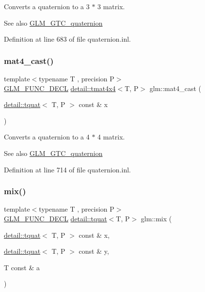 Converts a quaternion to a 3 $\ast$ 3 matrix.

\begin{DoxySeeAlso}{See also}
\hyperlink{group__gtc__quaternion}{G\+L\+M\+\_\+\+G\+T\+C\+\_\+quaternion} 
\end{DoxySeeAlso}


Definition at line 683 of file quaternion.\+inl.

\mbox{\label{group__gtc__quaternion_gafc4e34c836f7ccb5f3bb2a0373c831e0}} 
\subsubsection{\texorpdfstring{mat4\+\_\+cast()}{mat4\_cast()}}
{\footnotesize\ttfamily template$<$typename T , precision P$>$ \\
\hyperlink{setup_8hpp_ab2d052de21a70539923e9bcbf6e83a51}{G\+L\+M\+\_\+\+F\+U\+N\+C\+\_\+\+D\+E\+CL} \hyperlink{structglm_1_1detail_1_1tmat4x4}{detail\+::tmat4x4}$<$T, P$>$ glm\+::mat4\+\_\+cast (\begin{DoxyParamCaption}\item[{\hyperlink{structglm_1_1detail_1_1tquat}{detail\+::tquat}$<$ T, P $>$ const \&}]{x }\end{DoxyParamCaption})}

Converts a quaternion to a 4 $\ast$ 4 matrix.

\begin{DoxySeeAlso}{See also}
\hyperlink{group__gtc__quaternion}{G\+L\+M\+\_\+\+G\+T\+C\+\_\+quaternion} 
\end{DoxySeeAlso}


Definition at line 714 of file quaternion.\+inl.

\mbox{\label{group__gtc__quaternion_gafabf175ae3e2cd30bf58dc313321955a}} 
\subsubsection{\texorpdfstring{mix()}{mix()}}
{\footnotesize\ttfamily template$<$typename T , precision P$>$ \\
\hyperlink{setup_8hpp_ab2d052de21a70539923e9bcbf6e83a51}{G\+L\+M\+\_\+\+F\+U\+N\+C\+\_\+\+D\+E\+CL} \hyperlink{structglm_1_1detail_1_1tquat}{detail\+::tquat}$<$T, P$>$ glm\+::mix (\begin{DoxyParamCaption}\item[{\hyperlink{structglm_1_1detail_1_1tquat}{detail\+::tquat}$<$ T, P $>$ const \&}]{x,  }\item[{\hyperlink{structglm_1_1detail_1_1tquat}{detail\+::tquat}$<$ T, P $>$ const \&}]{y,  }\item[{T const \&}]{a }\end{DoxyParamCaption})}

